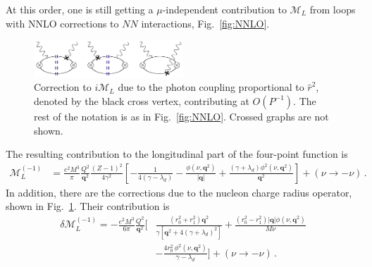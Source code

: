 \documentclass[prl,
twocolumn,
showpacs,preprintnumbers,amsmath,amssymb,
superscriptaddress,
a4paper,nofootinbib,longbibliography]{revtex4-2}
\def\bv#1{\boldsymbol{#1}}
\begin{document}
At this order, one is still getting a $\mu$-independent contribution to $\mathcal{M}_L$ from loops with NNLO corrections to $NN$ interactions, Fig.~\ref{fig:NNLO}.
\begin{figure}[htb]
    \centering
    \includegraphics[width=0.5\textwidth]{figs/VVCS_NNLO_RENucl.pdf}
    \caption{Correction to $i\mathcal{M}_L$ due to the photon coupling proportional to $\hat{r}^2$, denoted by the black cross vertex, contributing at $O(P^{-1})$. The rest of the notation is as in Fig.~\ref{fig:NNLO}. Crossed graphs are not shown.}
    \label{fig:NNLO_RE}
\end{figure}
The resulting contribution to the longitudinal part of the four-point function is
 \begin{align}
\mathcal{M}_{L}^{(-1)} & =\frac{e^2M^3}{\pi}\frac{Q^2}{\bv{q}^2}\frac{(Z-1)^2}{4\gamma^2}
\left[-\frac{1}{4(\gamma -\lambda_d)}-\frac{ \phi(\nu,\bv{q}^2)}{|\bv{q}|}+
\frac{(\gamma +\lambda_d) \phi^2(\nu,\bv{q}^2)}{\bv{q}^2}
\right]+(\nu\to-\nu)\,.
 \end{align}
 In addition, there are the corrections due to the nucleon charge radius operator, shown in Fig.~\ref{fig:NNLO_RE}. Their contribution is
\begin{align}
\delta\mathcal{M}_{L}^{(-1)}  = -\frac{e^2 M^3}{6\pi}\frac{Q^2}{\bv{q}^2}\biggl[&\frac{(r_0^2+r_1^2)\bv{q}^2 }{\gamma
\left[\bv{q}^2+4 (\gamma +\lambda_d )^2\right]}+
\frac{(r_0^2-r_1^2)|\bv{q}|  \phi(\nu,\bv{q}^2)}{M \nu }\nonumber\\
&-\frac{4 r_0^2\, 
\phi^2(\nu,\bv{q}^2)}{\gamma -\lambda_d}\biggr]+(\nu\to-\nu)\,.
\end{align}


 
\end{document}
